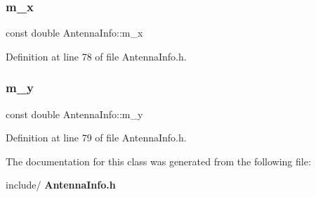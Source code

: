 \mbox{\label{class_antenna_info_aa59235225dd17d1ea3dd00eb2cc04829}} 
\subsubsection{m\_x}
{\footnotesize\ttfamily const double Antenna\+Info\+::m\+\_\+x\hspace{0.3cm}{\ttfamily [private]}}



Definition at line 78 of file Antenna\+Info.\+h.

\mbox{\label{class_antenna_info_a4722b100c3649ed22d6302b05694bc37}} 
\subsubsection{m\_y}
{\footnotesize\ttfamily const double Antenna\+Info\+::m\+\_\+y\hspace{0.3cm}{\ttfamily [private]}}



Definition at line 79 of file Antenna\+Info.\+h.



The documentation for this class was generated from the following file\+:\begin{DoxyCompactItemize}
\item 
include/\textbf{ Antenna\+Info.\+h}\end{DoxyCompactItemize}
